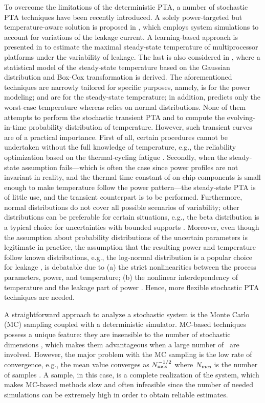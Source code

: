 To overcome the limitations of the deterministic PTA, a number of stochastic PTA techniques have been recently introduced. A solely power-targeted but temperature-aware solution is proposed in \cite{chandra2010}, which employs system simulations to account for variations of the leakage current. A learning-based approach is presented in \cite{juan2011} to estimate the maximal steady-state temperature of multiprocessor platforms under the variability of leakage. The last is also considered in \cite{juan2012}, where a statistical model of the steady-state temperature based on the Gaussian distribution and Box-Cox transformation is derived. The aforementioned techniques are narrowly tailored for specific purposes, namely, \cite{chandra2010} is for the power modeling; \cite{juan2011} and \cite{juan2012} are for the steady-state temperature; in addition, \cite{juan2011} predicts only the worst-case temperature whereas \cite{juan2012} relies on normal distributions. None of them attempts to perform the stochastic transient PTA and to compute the evolving-in-time probability distribution of temperature. However, such transient curves are of a practical importance. First of all, certain procedures cannot be undertaken without the full knowledge of temperature, e.g., the reliability optimization based on the thermal-cycling fatigue \cite{ukhov2012}. Secondly, when the steady-state assumption fails---which is often the case since power profiles are not invariant in reality, and the thermal time constant of on-chip components is small enough to make temperature follow the power pattern---the steady-state PTA is of little use, and the transient counterpart is to be performed. Furthermore, normal distributions do not cover all possible scenarios of variability; other distributions can be preferable for certain situations, e.g., the beta distribution is a typical choice for uncertainties with bounded supports \cite{maitre2010}. Moreover, even though the assumption about probability distributions of the uncertain parameters is legitimate in practice, the assumption that the resulting power and temperature follow known distributions, e.g., the log-normal distribution is a popular choice for leakage \cite{srivastava2010}, is debatable due to (a) the strict nonlinearities between the process parameters, power, and temperature; (b) the nonlinear interdependency of temperature and the leakage part of power \cite{liu2007}. Hence, more flexible stochastic PTA techniques are needed.

A straightforward approach to analyze a stochastic system is the Monte Carlo (MC) sampling coupled with a deterministic simulator. MC-based techniques possess a unique feature: they are insensible to the number of stochastic dimensions \cite{maitre2010}, which makes them advantageous when a large number of \rvs\ are involved. However, the major problem with the MC sampling is the low rate of convergence, e.g., the mean value converges as $N_\text{mcs}^{-{{1}/{2}}}$ where $N_\text{mcs}$ is the number of samples \cite{xiu2010, maitre2010}. A sample, in this case, is a complete realization of the system, which makes MC-based methods slow and often infeasible since the number of needed simulations can be extremely high in order to obtain reliable estimates.

